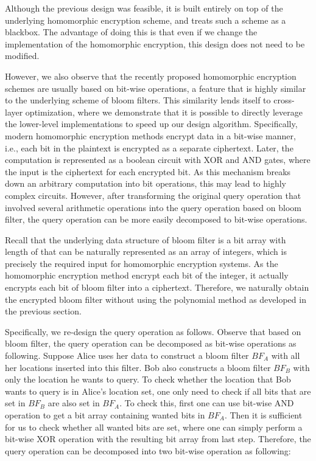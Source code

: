 Although the previous design was feasible, it is built entirely on top of the underlying homomorphic encryption scheme, and treats such a scheme as a blackbox. The advantage of doing this is that even if we change the implementation of the homomorphic encryption, this design does not need to be modified.

However, we also observe that the recently proposed homomorphic encryption schemes are usually based on bit-wise operations, a feature that is highly similar to the underlying scheme of bloom filters. This similarity lends itself to cross-layer optimization, where we demonstrate that it is possible to directly leverage the lower-level implementations to speed up our design algorithm. Specifically, modern homomorphic encryption methods encrypt data in a bit-wise manner, i.e., each bit in the plaintext is encrypted as a separate ciphertext. Later, the computation is represented as a boolean circuit with XOR and AND gates, where the input is the ciphertext for each encrypted bit. As this mechanism breaks down an arbitrary computation into bit operations, this may lead to highly complex circuits. However, after transforming the original query operation that involved several arithmetic operations into the query operation based on bloom filter, the query operation can be more easily decomposed to bit-wise operations.

Recall that the underlying data structure of bloom filter is a bit array with length of that can be naturally represented as an array of integers, which is precisely the required input for homomorphic encryption systems. As the homomorphic encryption method encrypt each bit of the integer, it actually encrypts each bit of bloom filter into a ciphertext. Therefore, we naturally obtain the encrypted bloom filter without using the polynomial method as developed in the previous section.

Specifically, we re-design the query operation as follows. Observe that based on bloom filter, the query operation can be decomposed as bit-wise operations as following. Suppose Alice uses her data to construct a bloom filter $BF_A$ with all her locations inserted into  this filter. Bob also constructs a bloom filter $BF_B$ with only the location he wants to query.  To check whether the location that Bob wants to query is in Alice’s location set, one only need to check if all bits that are set in $BF_B$ are also set in $BF_A$. To check this, first one can use bit-wise AND operation to get a bit array containing wanted bits in $BF_A$. Then it is sufficient for us to check whether all wanted bits are set, where one can simply perform a bit-wise XOR operation with the resulting bit array from last step. Therefore, the query operation can be decomposed into two bit-wise operation as following:

